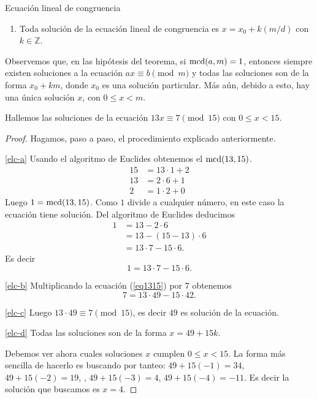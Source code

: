 \begin{section}{Ecuación lineal de congruencia}
\begin{enumerate}[label=\textit{\alph*)}]
Luego $x_0 = rt$ es solución de la ecuación lineal de congruencia. 
\item\label{elc-d}  Toda solución de la ecuación lineal de congruencia es $x= x_0+ k(m/d)$ con $k \in \mathbb Z$.
\end{enumerate}


Observemos que, en las hipótesis del teorema, si $\operatorname{mcd}(a,m) =1$, entonces siempre existen soluciones a la ecuación $ax\equiv b\pmod m$ y todas las soluciones son de la forma $x_0+km$, donde $x_0$ es una solución particular. Más aún, debido a esto, hay una única solución $x$, con $ 0\le x < m$. 



\begin{ejemplo*} Hallemos las soluciones de la ecuación $13x\equiv 7 \pmod{15}$ con $0\le x< 15$.
\end{ejemplo*}
\begin{proof}
Hagamos, paso a paso, el procedimiento explicado anteriormente.

\ref{elc-a}
Usando  el algoritmo de Euclides obtenemos el  $\operatorname{mcd}(13,15)$.
\begin{align*}
15 &=  13 \cdot 1 + 2 \\
13 &= 2 \cdot 6 + 1 \\
2 &= 1 \cdot 2 + 0
\end{align*}
Luego $1 = \operatorname{mcd}(13,15)$. Como $1$ divide a cualquier número, en este caso  la ecuación tiene solución. Del algoritmo de Euclides deducimos 
\begin{align*}
1 &= 13 - 2 \cdot 6\\
&= 13 - (15-13) \cdot 6  \\
&= 13\cdot 7 - 15\cdot 6. 
\end{align*}
Es decir
\begin{equation}\label{eq1315}
1 = 13\cdot 7 - 15\cdot 6. 
\end{equation}

\ref{elc-b} Multiplicando la ecuación (\ref{eq1315}) por $7$ obtenemos
$$
7 = 13\cdot 49 - 15\cdot 42. 
$$

\ref{elc-c} Luego $13 \cdot 49 \equiv 7 \pmod{15}$, es decir $49$ es solución de la ecuación.

\ref{elc-d} Todas las soluciones son de la forma  $x=49 + 15k$.

Debemos ver ahora cuales soluciones $x$ cumplen $0\le x< 15$. La forma más sencilla de hacerlo es buscando por tanteo: $49+15(-1)=34$, $49+15(-2)=19$, , $49+15(-3)=4$, $49+15(-4)=-11$.
Es decir la solución que buscamos es $x=4$.  
\end{proof}





\end{section}
